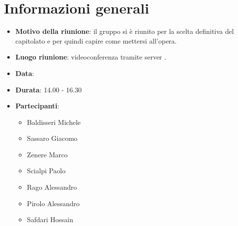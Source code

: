 \section{Informazioni generali}
\begin{itemize}
\item \textbf{Motivo della riunione}: il gruppo si è riunito per la scelta definitiva del capitolato e per quindi capire come mettersi all'opera.
\item \textbf{Luogo riunione}: videoconferenza tramite server .
\item \textbf{Data}: \Data{}
\item \textbf{Durata}: 14.00 - 16.30
\item \textbf{Partecipanti}:
	\begin{itemize}
	\item Baldisseri Michele
	\item Sassaro Giacomo
	\item Zenere Marco
	\item Scialpi Paolo
	\item Rago Alessandro
	\item Pirolo Alessandro
	\item Safdari Hossain
	\end{itemize}
\end{itemize}
\newpage
